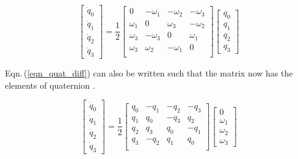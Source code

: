 \documentclass[12pt]{article}
\begin{document}
\begin{equation}
    \begin{bmatrix} 
        \dot{q}_{0} \\ \dot{q}_{1} \\ \dot{q}_{2} \\ \dot{q}_{3}
    \end{bmatrix}
    = \frac{1}{2}
    \begin{bmatrix}
        0 & -\omega_{1} & -\omega_{2} & -\omega_{3} \\
        \omega_{1} & 0 & \omega_{3} & -\omega_{2} \\
        \omega_{3} & -\omega_{3} & 0 & \omega_{1} \\
        \omega_{3} & \omega_{2} & -\omega_{1} & 0 \\
    \end{bmatrix}
    \begin{bmatrix} 
        q_{0} \\ q_{1} \\ q_{2} \\ q_{3}
    \end{bmatrix}
    \label{eqn_quat_diff}
\end{equation}

Eqn.\,(\ref{eqn_quat_diff}) can also be written such that the matrix now has the elements of quaternion \cite{hanspeter2009}. 

\begin{equation}
\begin{bmatrix} 
\dot{q}_{0} \\ \dot{q}_{1} \\ \dot{q}_{2} \\ \dot{q}_{3}
\end{bmatrix}
= \frac{1}{2}
\begin{bmatrix}
q_{0} & -q_{1} & -q_{2} & -q_{3} \\
q_{1} & q_{0} & -q_{3} & q_{2} \\
q_{2} & q_{3} & q_{0} & -q_{1} \\
q_{3} & -q_{2} & q_{1} & q_{0} \\
\end{bmatrix}
\begin{bmatrix}
0 \\ \omega_{1} \\ \omega_{2} \\ \omega_{3}
\end{bmatrix}
\label{eqn_quat_diff_i}
\end{equation}
 
\end{document}
